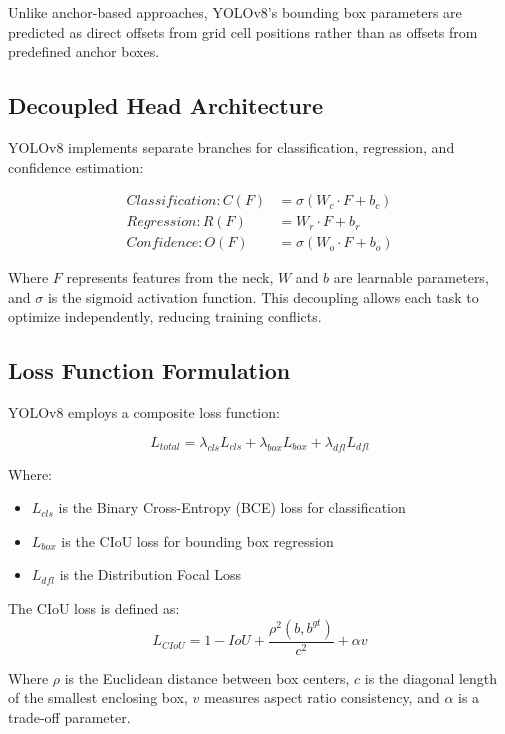 \documentclass[11pt]{article}
\begin{document}
Unlike anchor-based approaches, YOLOv8's bounding box parameters are predicted as direct offsets from grid cell positions rather than as offsets from predefined anchor boxes.

\subsection{Decoupled Head Architecture}
YOLOv8 implements separate branches for classification, regression, and confidence estimation:

\begin{align}
Classification: C(F) &= \sigma(W_c \cdot F + b_c) \\
Regression: R(F) &= W_r \cdot F + b_r \\
Confidence: O(F) &= \sigma(W_o \cdot F + b_o)
\end{align}

Where $F$ represents features from the neck, $W$ and $b$ are learnable parameters, and $\sigma$ is the sigmoid activation function. This decoupling allows each task to optimize independently, reducing training conflicts.

\subsection{Loss Function Formulation}
YOLOv8 employs a composite loss function:

\begin{equation}
L_{total} = \lambda_{cls}L_{cls} + \lambda_{box}L_{box} + \lambda_{dfl}L_{dfl}
\end{equation}

Where:
\begin{itemize}
\item $L_{cls}$ is the Binary Cross-Entropy (BCE) loss for classification
\item $L_{box}$ is the CIoU loss for bounding box regression
\item $L_{dfl}$ is the Distribution Focal Loss
\end{itemize}

The CIoU loss is defined as:
\begin{equation}
L_{CIoU} = 1 - IoU + \frac{\rho^2(b, b^{gt})}{c^2} + \alpha v
\end{equation}

Where $\rho$ is the Euclidean distance between box centers, $c$ is the diagonal length of the smallest enclosing box, $v$ measures aspect ratio consistency, and $\alpha$ is a trade-off parameter.
\end{document}
